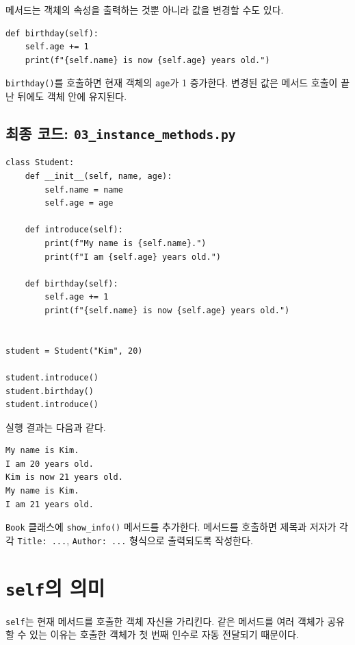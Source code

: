 \documentclass[11pt,a4paper]{article}
\begin{document}
메서드는 객체의 속성을 출력하는 것뿐 아니라 값을 변경할 수도 있다.

\begin{lstlisting}
def birthday(self):
    self.age += 1
    print(f"{self.name} is now {self.age} years old.")
\end{lstlisting}

\texttt{birthday()}를 호출하면 현재 객체의 \texttt{age}가 1 증가한다. 변경된 값은 메서드 호출이 끝난 뒤에도 객체 안에 유지된다.

\subsection{최종 코드: \texttt{03\_instance\_methods.py}}

\begin{lstlisting}
class Student:
    def __init__(self, name, age):
        self.name = name
        self.age = age

    def introduce(self):
        print(f"My name is {self.name}.")
        print(f"I am {self.age} years old.")

    def birthday(self):
        self.age += 1
        print(f"{self.name} is now {self.age} years old.")


student = Student("Kim", 20)

student.introduce()
student.birthday()
student.introduce()
\end{lstlisting}

실행 결과는 다음과 같다.

\begin{verbatim}
My name is Kim.
I am 20 years old.
Kim is now 21 years old.
My name is Kim.
I am 21 years old.
\end{verbatim}

\begin{practicebox}
\texttt{Book} 클래스에 \texttt{show\_info()} 메서드를 추가한다. 메서드를 호출하면 제목과 저자가 각각 \texttt{Title: ...}, \texttt{Author: ...} 형식으로 출력되도록 작성한다.
\end{practicebox}

\section{\texttt{self}의 의미}

\texttt{self}는 현재 메서드를 호출한 객체 자신을 가리킨다. 같은 메서드를 여러 객체가 공유할 수 있는 이유는 호출한 객체가 첫 번째 인수로 자동 전달되기 때문이다.
\end{document}
